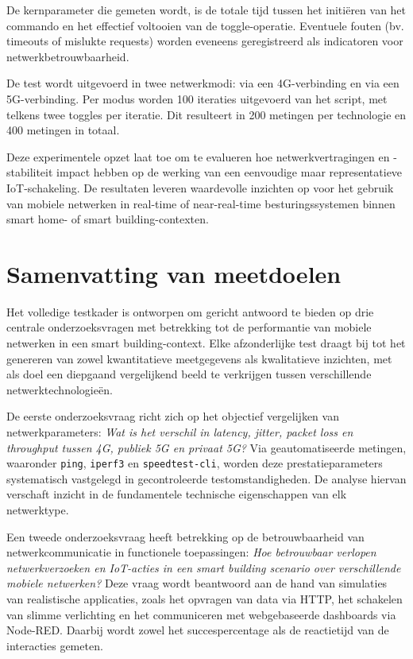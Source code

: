 
De kernparameter die gemeten wordt, is de totale tijd tussen het initiëren van het commando en het effectief voltooien van de toggle-operatie. Eventuele fouten (bv. timeouts of mislukte requests) worden eveneens geregistreerd als indicatoren voor netwerkbetrouwbaarheid.

De test wordt uitgevoerd in twee netwerkmodi: via een 4G-verbinding en via een 5G-verbinding. Per modus worden 100 iteraties uitgevoerd van het script, met telkens twee toggles per iteratie. Dit resulteert in 200 metingen per technologie en 400 metingen in totaal.

Deze experimentele opzet laat toe om te evalueren hoe netwerkvertragingen en -stabiliteit impact hebben op de werking van een eenvoudige maar representatieve IoT-schakeling. De resultaten leveren waardevolle inzichten op voor het gebruik van mobiele netwerken in real-time of near-real-time besturingssystemen binnen smart home- of smart building-contexten.


\section{Samenvatting van meetdoelen}


Het volledige testkader is ontworpen om gericht antwoord te bieden op drie centrale onderzoeksvragen met betrekking tot de performantie van mobiele netwerken in een smart building-context. Elke afzonderlijke test draagt bij tot het genereren van zowel kwantitatieve meetgegevens als kwalitatieve inzichten, met als doel een diepgaand vergelijkend beeld te verkrijgen tussen verschillende netwerktechnologieën.

De eerste onderzoeksvraag richt zich op het objectief vergelijken van netwerkparameters: \textit{Wat is het verschil in latency, jitter, packet loss en throughput tussen 4G, publiek 5G en privaat 5G?} Via geautomatiseerde metingen, waaronder \texttt{ping}, \texttt{iperf3} en \texttt{speedtest-cli}, worden deze prestatieparameters systematisch vastgelegd in gecontroleerde testomstandigheden. De analyse hiervan verschaft inzicht in de fundamentele technische eigenschappen van elk netwerktype.

Een tweede onderzoeksvraag heeft betrekking op de betrouwbaarheid van netwerkcommunicatie in functionele toepassingen: \textit{Hoe betrouwbaar verlopen netwerkverzoeken en IoT-acties in een smart building scenario over verschillende mobiele netwerken?} Deze vraag wordt beantwoord aan de hand van simulaties van realistische applicaties, zoals het opvragen van data via HTTP, het schakelen van slimme verlichting en het communiceren met webgebaseerde dashboards via Node-RED. Daarbij wordt zowel het succespercentage als de reactietijd van de interacties gemeten.

